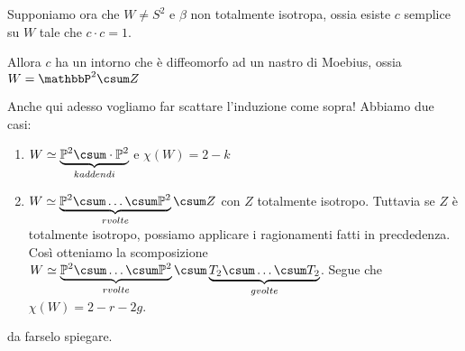 Supponiamo ora che $W\neq S^2$ e $\beta$ non totalmente isotropa, ossia esiste $c$ semplice su $W$ tale che $c\cdot c = 1$.
\begin{oss}
 Allora $c$ ha un intorno che è diffeomorfo ad un nastro di Moebius, ossia $W=\mathbbP ^2 \csum Z$
\end{oss}
Anche qui adesso vogliamo far scattare l'induzione come sopra! Abbiamo due casi:
\begin{enumerate}
 \item $W\simeq \underbrace {\mathbb P^2\csum \cdot \mathbb P^2}_{k addendi}$ e $\chi (W) = 2 - k$
 \item $W\simeq\underbrace{\mathbb P^2\csum \dots \csum \mathbb P^2}_{r volte}\csum Z$ con $Z$ totalmente isotropo.
 Tuttavia se $Z$ è totalmente isotropo, possiamo applicare i ragionamenti fatti in precdedenza. Così otteniamo la scomposizione
 $W \simeq \underbrace{\mathbb P^2\csum \dots \csum \mathbb P^2}_{r volte}\csum \underbrace{T_2\csum \dots \csum T_2}_{g volte}$.
 Segue che $\chi(W) = 2-r-2g$.
\end{enumerate}
\begin{lemma}
 da farselo spiegare.
\end{lemma}



